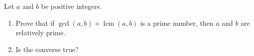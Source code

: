 Let $a$ and $b$ be positive integers.
\begin{enumerate}
\item[(a)] Prove that if $\gcd(a,b)+\operatorname{lcm}(a,b)$ is a prime number, then $a$ and $b$ are relatively prime.
\item[(b)] Is the converse true?
\end{enumerate}
